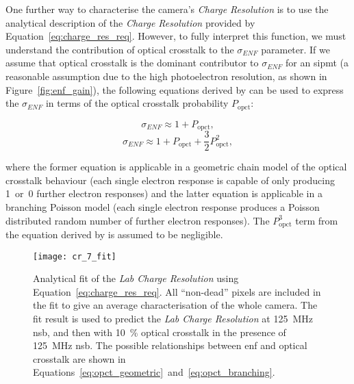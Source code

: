 One further way to characterise the camera's \textit{Charge Resolution} is to use the analytical description of the \textit{Charge Resolution} provided by Equation~\ref{eq:charge_res_req}. However, to fully interpret this function, we must understand the contribution of optical crosstalk to the $\sigma_{ENF}$ parameter. If we assume that optical crosstalk is the dominant contributor to $\sigma_{ENF}$ for an \gls{sipmt} (a reasonable assumption due to the high photoelectron resolution, as shown in Figure~\ref{fig:enf_gain}), the following equations derived by \textcite{Vinogradov2012} can be used to express the $\sigma_{ENF}$ in terms of the optical crosstalk probability $P_\text{opct}$:
\begin{minipage}{\textwidth}
\begin{equation} \label{eq:opct_geometric}
\sigma_{ENF} \approx 1 + P_\text{opct},
\end{equation}
\begin{equation} \label{eq:opct_branching}
\sigma_{ENF} \approx 1 + P_\text{opct} + \frac{3}{2} P_\text{opct}^2,
\end{equation}
\end{minipage}
where the former equation is applicable in a geometric chain model of the optical crosstalk behaviour (each single electron response is capable of only producing 1~or~0 further electron responses) and the latter equation is applicable in a branching Poisson model (each single electron response produces a Poisson distributed random number of further electron responses). The $P_\text{opct}^3$ term from the equation derived by \textcite{Vinogradov2012} is assumed to be negligible.

\begin{figure}[h]
	\centering
    \texttt{[image: cr\_7\_fit]} 
	\caption[Analytical fit of the \textit{Lab Charge Resolution}.]{Analytical fit of the \textit{Lab Charge Resolution} using Equation~\ref{eq:charge_res_req}. All ``non-dead'' pixels are included in the fit to give an average characterisation of the whole camera. The fit result is used to predict the \textit{Lab Charge Resolution} at \SI{125}{MHz} \gls{nsb}, and then with \SI{10}{\percent} optical crosstalk in the presence of \SI{125}{MHz} \gls{nsb}. The possible relationships between \gls{enf} and optical crosstalk are shown in Equations~\ref{eq:opct_geometric}~and~\ref{eq:opct_branching}.}
	\label{fig:cr_7_fit}
\end{figure}

